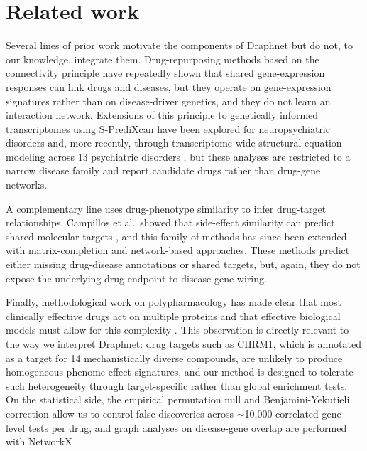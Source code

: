 \section{Related work}

Several lines of prior work motivate the components of Draphnet but do not,
to our knowledge, integrate them. Drug-repurposing methods based on the
connectivity principle \cite{lamb2006cmap,subramanian2017lincs,sirota2011drugrepo}
have repeatedly shown that shared gene-expression responses can link drugs
and diseases, but they operate on gene-expression signatures rather than on
disease-driver genetics, and they do not learn an interaction network.
Extensions of this principle to genetically informed transcriptomes using
S-PrediXcan have been explored for neuropsychiatric disorders
\cite{so2017neuropsychiatric,reay2020pes} and, more recently, through
transcriptome-wide structural equation modeling across 13 psychiatric
disorders \cite{grotzinger2023tsem}, but these analyses are restricted to a
narrow disease family and report candidate drugs rather than drug-gene
networks.

A complementary line uses drug-phenotype similarity to infer drug-target
relationships. Campillos et al.\ showed that side-effect similarity can
predict shared molecular targets \cite{campillos2008sideeffect}, and this
family of methods has since been extended with matrix-completion and
network-based approaches. These methods predict either missing drug-disease
annotations or shared targets, but, again, they do not expose the underlying
drug-endpoint-to-disease-gene wiring.

Finally, methodological work on polypharmacology has made clear that most
clinically effective drugs act on multiple proteins and that effective
biological models must allow for this complexity
\cite{hopkins2008network}. This observation is directly relevant to the
way we interpret Draphnet: drug targets such as CHRM1, which is annotated as
a target for 14 mechanistically diverse compounds, are unlikely to produce
homogeneous phenome-effect signatures, and our method is designed to
tolerate such heterogeneity through target-specific rather than global
enrichment tests. On the statistical side, the empirical permutation null
and Benjamini-Yekutieli correction \cite{benjamini2001fdrdependency,benjamini1995fdr}
allow us to control false discoveries across $\sim$10,000 correlated
gene-level tests per drug, and graph analyses on disease-gene overlap are
performed with NetworkX \cite{hagberg2008networkx}.
